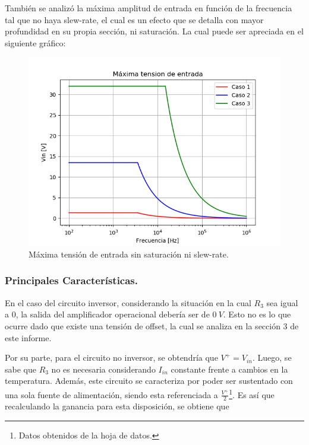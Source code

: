 También se analizó la máxima amplitud de entrada en función de la frecuencia tal que no haya slew-rate, el cual es un efecto que se detalla con mayor profundidad en su propia sección, ni saturación.
La cual puede ser apreciada en el siguiente gráfico:
\begin{figure}[H]	
	\centering
	\includegraphics[width=\textwidth]{Ejercicio1/Imagenes/maxvinsr.png}
	\caption{Máxima tensión de entrada sin saturación ni slew-rate.}
	\label{fig:MaxVinsr}
\end{figure} 
\subsubsection{Principales Características.}
En el caso del circuito inversor, considerando la situación en la cual $R_3$ sea igual a 0, la salida del amplificador operacional debería ser de $0 \ V$. Esto no es lo que ocurre dado que existe una tensión de offset, la cual se analiza en la sección 3 de este informe.


Por su parte, para el circuito no inversor,
se obtendría que $V^+ = V_{in}$. Luego, se sabe que $R_3$ no es necesaria considerando $I_{in}$ constante frente a cambios en la temperatura. Además, este circuito se caracteriza por poder ser sustentado con una sola fuente de alimentación, siendo esta referenciada a $\frac{V^+}{2}$\footnote{Datos obtenidos de la hoja de datos.}. Es así que recalculando la ganancia para esta disposición, se obtiene que 

